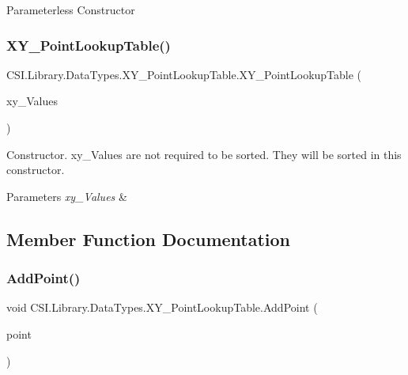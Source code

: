 Parameterless Constructor 

\mbox{\label{class_c_s_i_1_1_library_1_1_data_types_1_1_x_y___point_lookup_table_aeac36bfc5b7f8b0a6fcb593a94536f2e}} 
\subsubsection{\texorpdfstring{XY\_PointLookupTable()}{XY\_PointLookupTable()}\hspace{0.1cm}{\footnotesize\ttfamily [2/2]}}
{\footnotesize\ttfamily C\+S\+I.\+Library.\+Data\+Types.\+X\+Y\+\_\+\+Point\+Lookup\+Table.\+X\+Y\+\_\+\+Point\+Lookup\+Table (\begin{DoxyParamCaption}\item[{\mbox{\hyperlink{struct_c_s_i_1_1_library_1_1_data_types_1_1_x_y___point}{X\+Y\+\_\+\+Point}} \mbox{[}$\,$\mbox{]}}]{xy\+\_\+\+Values }\end{DoxyParamCaption})\hspace{0.3cm}{\ttfamily [inline]}}



Constructor. xy\+\_\+\+Values are not required to be sorted. They will be sorted in this constructor. 


\begin{DoxyParams}{Parameters}
{\em xy\+\_\+\+Values} & \\
\hline
\end{DoxyParams}


\subsection{Member Function Documentation}
\mbox{\label{class_c_s_i_1_1_library_1_1_data_types_1_1_x_y___point_lookup_table_a5035954b59020011337bf06780fc5208}} 
\subsubsection{\texorpdfstring{AddPoint()}{AddPoint()}}
{\footnotesize\ttfamily void C\+S\+I.\+Library.\+Data\+Types.\+X\+Y\+\_\+\+Point\+Lookup\+Table.\+Add\+Point (\begin{DoxyParamCaption}\item[{\mbox{\hyperlink{struct_c_s_i_1_1_library_1_1_data_types_1_1_x_y___point}{X\+Y\+\_\+\+Point}}}]{point }\end{DoxyParamCaption})\hspace{0.3cm}{\ttfamily [inline]}}



